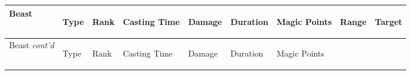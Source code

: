 \documentclass[twoside]{book}
\begin{document}
\begin{longtable}{p{1.25in}lp{2em}p{3em}llp{7em}ll} 
  Beast
  &
  \begin{turn}{70}{Type}\end{turn}
          
  &
  \begin{turn}{70}{Rank}\end{turn}
          
  &
  \begin{turn}{70}{Casting Time}\end{turn}
          
  &
  \begin{turn}{70}{Damage}\end{turn}
          
  &
  \begin{turn}{70}{Duration}\end{turn}
          
  &
  \begin{turn}{70}{Magic Points}\end{turn}
          
  &
  \begin{turn}{70}{Range}\end{turn}
          
  &
  \begin{turn}{70}{Target}\end{turn}
          
  \\
  \hline
  \hline
  \endfirsthead
  Beast \textit{cont'd}
        
  &
  \begin{turn}{70}{Type}\end{turn}
          
  &
  \begin{turn}{70}{Rank}\end{turn}
          
  &
  \begin{turn}{70}{Casting Time}\end{turn}
          
  &
  \begin{turn}{70}{Damage}\end{turn}
          
  &
  \begin{turn}{70}{Duration}\end{turn}
          
  &
  \begin{turn}{70}{Magic Points}\end{turn}
          

\end{longtable}
\end{document}
